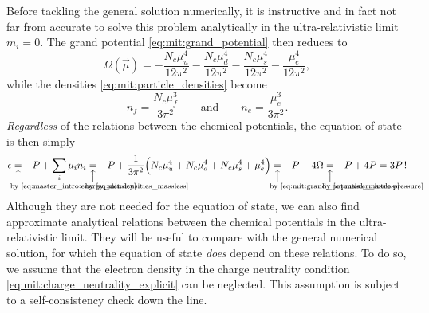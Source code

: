 Before tackling the general solution numerically,
it is instructive and in fact not far from accurate to solve this problem analytically in the ultra-relativistic limit $m_i = 0$.
The grand potential \eqref{eq:mit:grand_potential} then reduces to
\begin{equation}
	\Omega(\vec{\mu}) = -\frac{N_c \mu_u^4}{12 \pi^2} - \frac{N_c \mu_d^4}{12 \pi^2} - \frac{N_c \mu_s^4}{12 \pi^2} - \frac{\mu_e^4}{12 \pi^2},
\label{eq:mit:grand_potential_massless}
\end{equation}
while the densities \eqref{eq:mit:particle_densities} become
\begin{equation}
	n_f = \frac{N_c \mu_f^3}{3 \pi^2}
	\qquad \text{and} \qquad
	n_e = \frac{    \mu_e^3}{3 \pi^2}.
\label{eq:mit:densities_massless}
\end{equation}
\emph{Regardless} of the relations between the chemical potentials,
the equation of state is then simply
\begin{equation}
	\epsilon \equalexplbelow{\text{by \eqref{eq:master_intro:energy_density}}} -P + \sum_i \mu_i n_i
	         \equalexplbelow{\text{by \eqref{eq:mit:densities_massless}}} -P + \frac{1}{3 \pi^2} \Big(N_c \mu_u^4 + N_c \mu_d^4 + N_c \mu_s^4 + \mu_e^4\Big)
	         \equalexplbelow{\text{by \eqref{eq:mit:grand_potential_massless}}} -P - 4 \Omega 
	         \equalexplbelow{\text{by \eqref{eq:master_intro:pressure}}} -P + 4 P 
	         = 3 P \, !
\label{eq:mit:eos_ur}
\end{equation}
Although they are not needed for the equation of state,
we can also find approximate analytical relations between the chemical potentials in the ultra-relativistic limit.
They will be useful to compare with the general numerical solution, for which the equation of state \emph{does} depend on these relations.
To do so, we assume that the electron density in the charge neutrality condition \eqref{eq:mit:charge_neutrality_explicit} can be neglected.
This assumption is subject to a self-consistency check down the line.

